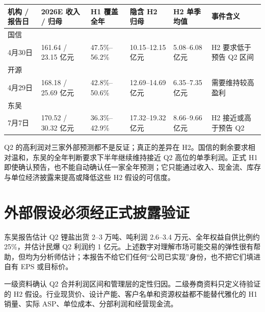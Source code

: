 \begin{exhibitbox}[H1 预告对外部全年预测的覆盖与隐含 H2]
\begin{tabularx}{\exhibitboxwidth}{L{2.1cm}R{2.5cm}R{2.0cm}R{2.1cm}R{2.1cm}X}
\toprule
机构 / 报告日 & 2026E 收入 / 归母 & H1 覆盖全年 & 隐含 H2 归母 & H2 单季均值 & 事件含义 \\
\midrule
国信\\4月30日 & 161.64 / 23.15 亿元 & 47.5\%--56.2\% & 10.15--12.15 亿元 & 5.08--6.08 亿元 & H2 要求低于预告 Q2 区间 \\
开源\\4月29日 & 168.18 / 25.69 亿元 & 42.8\%--50.6\% & 12.69--14.69 亿元 & 6.35--7.35 亿元 & 需要维持较高盈利 \\
东吴\\7月7日 & 170.52 / 30.32 亿元 & 36.3\%--42.9\% & 17.32--19.32 亿元 & 8.66--9.66 亿元 & H2 接近或高于预告 Q2 \\
\bottomrule
\end{tabularx}
\end{exhibitbox}

\begin{keyinsight}[预期差的正确表述]
Q2 的高利润对三家外部预测都不是反证；真正的差异在 H2。国信的剩余要求相对温和，东吴的全年判断要求下半年继续维持接近 Q2 高位的单季利润。正式 H1 即使确认预告，也不能自动确认任一家全年预测；它只能通过收入、现金流、库存与单位经济披露来提高或降低这些 H2 假设的可信度。
\end{keyinsight}

\section{外部假设必须经正式披露验证}

东吴报告估计 Q2 锂盐出货 2--3 万吨、吨利润 2.6--3.4 万元、全年权益自供比例约 25\%，并估计民爆 Q2 利润约 1 亿元。上述数字对理解市场可能交易的弹性很有帮助，但均为分析师估计；本报告不给它们任何“公司已实现”身份，也不把它们填进自有 EPS 或目标价。

\begin{sourcequalitybox}[事件研究的证据层级]
一级资料确认 Q2 合并利润区间和管理层的定性归因。二级券商资料只定义待验证的 H2 假设。行业现货价、设计产能、客户名单和资源权益都不能替代雅化的 H1 销量、实际 ASP、单位成本、分部利润和经营现金流。
\end{sourcequalitybox}
